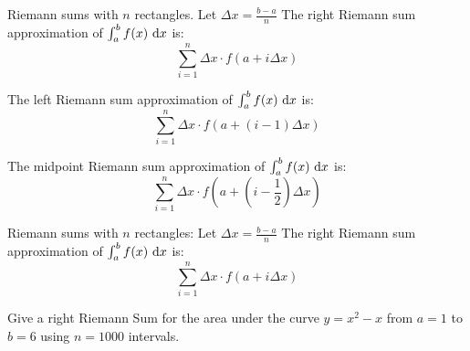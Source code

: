 \begin{frame}[t]
\begin{block}{Riemann sums with $n$ rectangles. Let $\Delta x = \frac{b-a}{n}$}
The \alert{right} Riemann sum approximation of $\int_a^b f(x) ~\text{d} x$ is:
\[\sum_{i=1}^n \Delta x\cdot f\left(a+i\Delta x\right)\]

The \alert{left} Riemann sum approximation of $\int_a^b f(x) ~\text{d} x$ is:
\[\sum_{i=1}^n \Delta x\cdot f\left(a+(i-1)\Delta x\right)\]

The \alert{midpoint} Riemann sum approximation of $\int_a^b f(x) ~\text{d} x$ is:
\[ \sum_{i=1}^n \Delta x\cdot f\left(a+\left(i-\frac12\right)\Delta x\right)\]
\end{block}

\end{frame}

\begin{frame}[t]
\begin{block}{Riemann sums with $n$ rectangles: Let $\Delta x = \frac{b-a}{n}$}
The \alert{right} Riemann sum approximation of $\int_a^b f(x) ~\text{d} x$ is:
\[\sum_{i=1}^n \Delta x\cdot f\left(a+i\Delta x\right)\]
\end{block}

Give a right Riemann Sum for the area under the curve $y=x^2-x$ from $a=1$ to $b=6$ using $n=1000$ intervals.
\vfill
{}
\end{frame}

